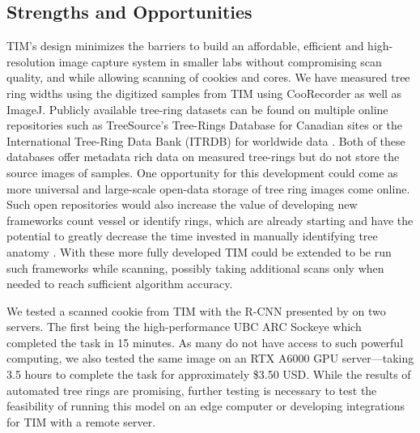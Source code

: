 \documentclass[a4paper,12pt]{article}
\begin{document}
\subsection{Strengths and Opportunities} %
TIM's design minimizes the barriers to build an affordable, efficient and high-resolution image capture system in smaller labs without compromising scan quality, and while allowing scanning of cookies and cores. We have measured tree ring widths using the digitized samples from TIM using CooRecorder as well as ImageJ.
Publicly available tree-ring datasets can be found on multiple online repositories such as TreeSource's Tree-Rings Database for Canadian sites or the International Tree-Ring Data Bank (ITRDB) for worldwide data \citep{girardin_national_2021} \citep{grissino-mayer_international_1997}.
Both of these databases offer metadata rich data on measured tree-rings but do not store the source images of samples.
One opportunity for this development could come as more universal and large-scale open-data storage of tree ring images come online. 
Such open repositories would also increase the value of developing new frameworks count vessel or identify rings, which are already starting and have the potential to greatly decrease the time invested in manually identifying tree anatomy \citep{resente_mask_2021} \citep{polacek_automation_2023}. 
With these more fully developed TIM could be extended to be run such frameworks while scanning, possibly taking additional scans only when needed to reach sufficient algorithm accuracy. %

We tested a scanned cookie from TIM with the R-CNN presented by \citeauthor{polacek_automation_2023} on two servers. The first being the high-performance UBC ARC Sockeye which completed the task in 15 minutes. As many do not have access to such powerful computing, we also tested
the same image on an RTX A6000 GPU server---taking 3.5 hours to complete the task for approximately \$3.50 USD. 
While the results of automated tree rings are promising, further testing is necessary to test the feasibility of running this model on an edge computer or developing integrations for TIM with a remote server.  
\end{document}
